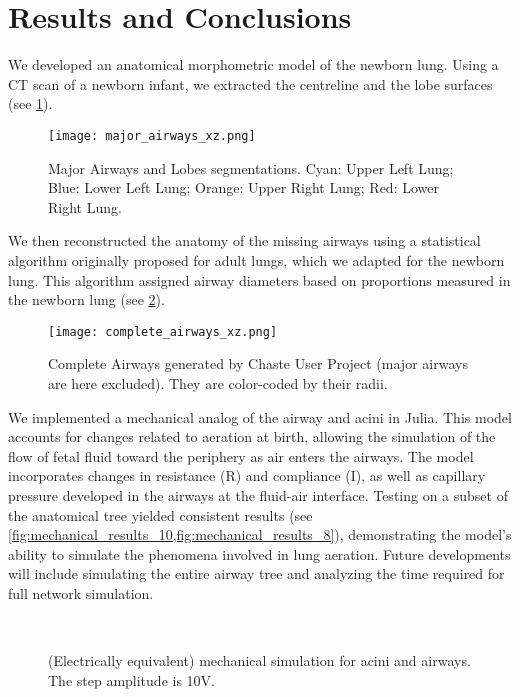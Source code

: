 \section{Results and Conclusions}
\label{sec:results_and_conclusions}

We developed an anatomical morphometric model of the newborn
lung. Using a CT scan of a newborn infant, we extracted the centreline
and the lobe surfaces (see \cref{fig:major_airways_xz}).

\begin{figure}[h]\centering
  \texttt{[image: major\_airways\_xz.png]}
  \caption{Major Airways and Lobes segmentations.  Cyan: Upper Left
    Lung; Blue: Lower Left Lung; Orange: Upper Right Lung; Red: Lower
    Right Lung.}
  \label{fig:major_airways_xz}
\end{figure}

We then reconstructed the anatomy of the missing airways using a
statistical algorithm originally proposed for adult lungs, which we
adapted for the newborn lung. This algorithm assigned airway diameters
based on proportions measured in the newborn lung (see
\cref{fig:complete_airways_xz}).

\begin{figure}[h]\centering
  \texttt{[image: complete\_airways\_xz.png]}
  \caption{Complete Airways generated by Chaste User Project (major
    airways are here excluded).  They are color-coded by their radii.}
  \label{fig:complete_airways_xz}
\end{figure}

We implemented a mechanical analog of the airway and acini in
Julia. This model accounts for changes related to aeration at birth,
allowing the simulation of the flow of fetal fluid toward the
periphery as air enters the airways.  The model incorporates changes
in resistance (R) and compliance (I), as well as capillary pressure
developed in the airways at the fluid-air interface. Testing on a
subset of the anatomical tree yielded consistent results (see
\cref{fig:mechanical_results_10,fig:mechanical_results_8}),
demonstrating the model's ability to simulate the phenomena involved
in lung aeration. Future developments will include simulating the
entire airway tree and analyzing the time required for full network
simulation.

\begin{figure}[h]\centering
  \\
  \caption{(Electrically equivalent) mechanical simulation for acini
    and airways.  The step amplitude is 10V.}
  \label{fig:mechanical_results_10}
\end{figure}


